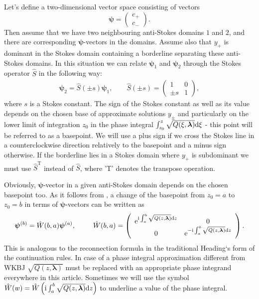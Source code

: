 \documentclass[12pt]{iopart}
\def\S{\hat{S}}
\def\W{\hat{W}}
\def\psii{\bm\psi}
\def\lmbd{\bm{\lambda}}
\def\T{\mathrm{T}}
\begin{document}
Let's define a two-dimensional vector space consisting of vectors
\[
\psii= \left(\begin{array}{*{2}{c}} c_+ \\ c_- \end{array}\right).
\]
Then assume that we have two neighbouring anti-Stokes domains $1$ and $2$, and there are 
corresponding $\psii$-vectors in the domains. Assume also that $y_+$ is dominant in the Stokes domain containing a borderline separating these anti-Stokes domains. 
In this situation we can relate $\psii_1$ and $\psii_2$ through the Stokes operator $\S$ in the following way:
\begin{eqnarray}
\psii_2 = \S(\pm s) \psii_1, \qquad 
\S(\pm s) = \left(\begin{array}{*{2}{c}} 1 & 0 \\ \pm s & 1 \end{array}\right),    
\end{eqnarray}
where $s$ is a Stokes constant. The sign of the Stokes constant as well as its value depends on the chosen base of approximate solutions $y_\pm$ and particularly on the lower limit of integration $z_0$ in the phase integral $\int_{z_0}^z \sqrt{Q(\xi, \lmbd)} \rmd \xi$ - this point will be referred to as a basepoint. We will use a plus sign if we cross the Stokes line in a counterclockwise direction relatively to the basepoint and a minus sign otherwise. If the borderline lies in a Stokes domain where $y_+$ is subdominant we must use $\S^{\T}$ instead of $\S$, where 'T' denotes the transpose operation.

Obviously, $\psii$-vector in a given anti-Stokes domain depends on the chosen basepoint too. As it follows from , a change of the basepoint from $z_0=a$ to $z_0=b$ in terms of $\psii$-vectors can be written as
\begin{eqnarray}
\psii^{(b)} = \W(b,a) \psii^{(a)}, \qquad 
\W(b,a) =  
\left(\begin{array}{*{2}{c}}
\rme^{\rmi \int_a^b \sqrt{Q(z,\lmbd)} \rmd z} & 0 \\ 0 & \rme^{-\rmi \int_a^b \sqrt{Q(z,\lmbd)} \rmd z} 
\end{array}\right).
\end{eqnarray}
This is analogous to the reconnection formula in the traditional Heading`s form of the continuation rules. In case of a phase integral approximation different from WKBJ $\sqrt{Q(z,\lmbd)}$ must be replaced with an appropriate phase integrand  everywhere in this article. Sometimes we will use the symbol 
$\W(w)=\W \left( \rmi \int_a^b \sqrt{Q(z,\lmbd)} \rmd z \right)$ to underline a value of the phase integral. 
\end{document}
